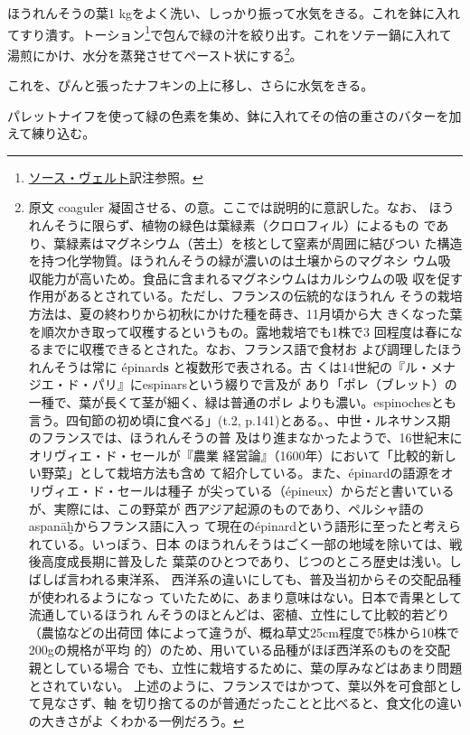 \begin{recette}
ほうれんそうの葉1
kgをよく洗い、しっかり振って水気をきる。これを鉢に入れてすり潰す。トーション\footnote{\protect\hyperlink{sauce-verte}{ソース・ヴェルト}訳注参照。}で包んで緑の汁を絞り出す。これをソテー鍋に入れて湯煎にかけ、水分を蒸発させてペースト状にする\footnote{原文
  coaguler 凝固させる、の意。ここでは説明的に意訳した。なお、
  ほうれんそうに限らず、植物の緑色は葉緑素（クロロフィル）によるもの
  であり、葉緑素はマグネシウム（苦土）を核として窒素が周囲に結びつい
  た構造を持つ化学物質。ほうれんそうの緑が濃いのは土壌からのマグネシ
  ウム吸収能力が高いため。食品に含まれるマグネシウムはカルシウムの吸
  収を促す作用があるとされている。ただし、フランスの伝統的なほうれん
  そうの栽培方法は、夏の終わりから初秋にかけた種を蒔き、11月頃から大
  きくなった葉を順次かき取って収穫するというもの。露地栽培でも1株で3
  回程度は春になるまでに収穫できるとされた。なお、フランス語で食材お
  よび調理したほうれんそうは常に épinard\textbf{s}
  と複数形で表される。古
  くは14世紀の『ル・メナジエ・ド・パリ』にespinarsという綴りで言及が
  あり「ポレ（ブレット）の一種で、葉が長くて茎が細く、緑は普通のポレ
  よりも濃い。espinochesとも言う。四旬節の初め頃に食べる」(t.2,
  p.141)とある。、中世・ルネサンス期のフランスでは、ほうれんそうの普
  及はり進まなかったようで、16世紀末にオリヴィエ・ド・セールが『農業
  経営論』（1600年）において「比較的新しい野菜」として栽培方法も含め
  て紹介している。また、épinardの語源をオリヴィエ・ド・セールは種子
  が尖っている（épineux）からだと書いているが、実際には、この野菜が
  西アジア起源のものであり、ペルシャ語のaspanāḫからフランス語に入っ
  て現在のépinardという語形に至ったと考えられている。いっぽう、日本
  のほうれんそうはごく一部の地域を除いては、戦後高度成長期に普及した
  葉菜のひとつであり、じつのところ歴史は浅い。しばしば言われる東洋系、
  西洋系の違いにしても、普及当初からその交配品種が使われるようになっ
  ていたために、あまり意味はない。日本で青果として流通しているほうれ
  んそうのほとんどは、密植、立性にして比較的若どり（農協などの出荷団
  体によって違うが、概ね草丈25cm程度で5株から10株で200gの規格が平均
  的）のため、用いている品種がほぼ西洋系のものを交配親としている場合
  でも、立性に栽培するために、葉の厚みなどはあまり問題とされていない。
  上述のように、フランスではかつて、葉以外を可食部として見なさず、軸
  を切り捨てるのが普通だったことと比べると、食文化の違いの大きさがよ
  くわかる一例だろう。}。

これを、ぴんと張ったナフキンの上に移し、さらに水気をきる。

パレットナイフを使って緑の色素を集め、鉢に入れてその倍の重さのバターを加えて練り込む。


\end{recette}
